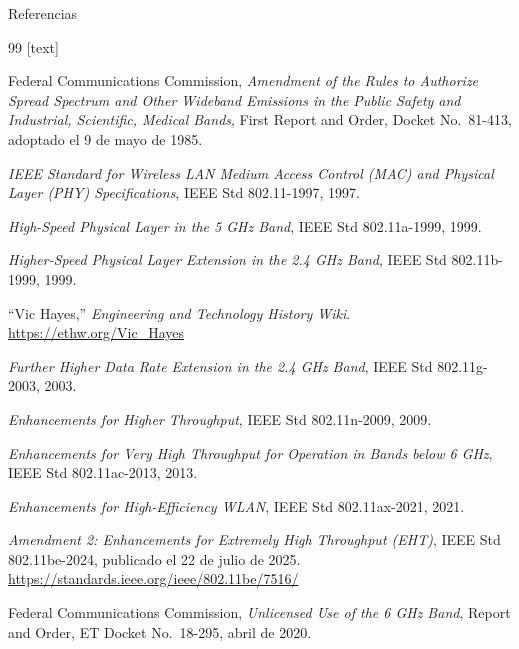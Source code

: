 \documentclass[aspectratio=169,10pt]{beamer}
\begin{document}
\begin{frame}[allowframebreaks]{Referencias}
  \scriptsize
  \setlength{\parskip}{0.15em}
  \begin{thebibliography}{99}
    [text]

     Federal Communications Commission,
      \textit{Amendment of the Rules to Authorize Spread Spectrum and Other Wideband
      Emissions in the Public Safety and Industrial, Scientific, Medical Bands},
      First Report and Order, Docket No.~81-413, adoptado el 9 de mayo de 1985.

     \textit{IEEE Standard for Wireless LAN Medium Access Control (MAC)
      and Physical Layer (PHY) Specifications}, IEEE Std 802.11-1997, 1997.

     \textit{High-Speed Physical Layer in the 5 GHz Band},
      IEEE Std 802.11a-1999, 1999.

     \textit{Higher-Speed Physical Layer Extension in the 2.4 GHz Band},
      IEEE Std 802.11b-1999, 1999.

     ``Vic Hayes,'' \textit{Engineering and Technology History Wiki}.
       \url{https://ethw.org/Vic_Hayes}

     \textit{Further Higher Data Rate Extension in the 2.4 GHz Band},
      IEEE Std 802.11g-2003, 2003.

     \textit{Enhancements for Higher Throughput},
      IEEE Std 802.11n-2009, 2009.

     \textit{Enhancements for Very High Throughput for Operation
      in Bands below 6 GHz}, IEEE Std 802.11ac-2013, 2013.

    \framebreak

     \textit{Enhancements for High-Efficiency WLAN},
      IEEE Std 802.11ax-2021, 2021.

     \textit{Amendment 2: Enhancements for Extremely High Throughput (EHT)},
      IEEE Std 802.11be-2024, publicado el 22 de julio de 2025.\\ \hspace*{0pt}\url{https://standards.ieee.org/ieee/802.11be/7516/}

     Federal Communications Commission, \textit{Unlicensed Use of the
      6 GHz Band}, Report and Order, ET Docket No.~18-295, abril de 2020.


\end{thebibliography}
\end{frame}
\end{document}
